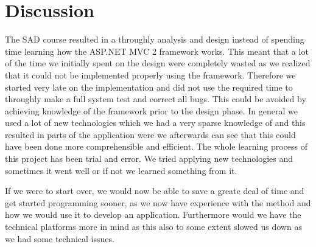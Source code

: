 \chapter{Discussion}
\label{chap:discussion}

The SAD course resulted in a throughly analysis and design instead of spending time learning how the ASP.NET MVC 2 framework works. This meant that a lot of the time we initially spent on the design were completely wasted as we realized that it could not be implemented properly using the framework. Therefore we started very late on the implementation and did not use the required time to throughly make a full system test and correct all bugs. This could be avoided by achieving knowledge of the framework prior to the design phase. 
In general we used a lot of new technologies which we had a very sparse knowledge of and this resulted in parts of the application were we afterwards can see that this could have been done more comprehensible and efficient. The whole learning process of this project has been trial and error. We tried applying new technologies and sometimes it went well or if not we learned something from it.

If we were to start over, we would now be able to save a greate deal of time and get started programming sooner, as we now have experience with the \ooad{} method and how we would use it to develop an application. Furthermore would we have the technical platforms more in mind as this also to some extent slowed us down as we had some technical issues.